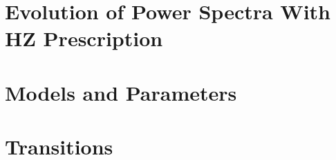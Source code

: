\documentclass[12pt,a4paper]{book}
\begin{document}
\section{Evolution of Power Spectra With HZ Prescription}





\section{Models and Parameters}




\section{Transitions}
\end{document}
